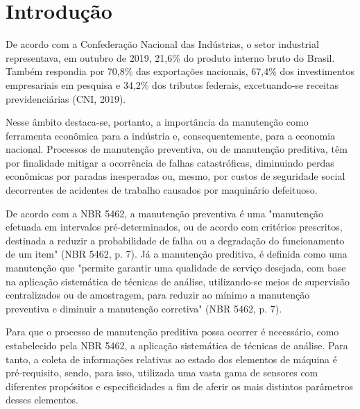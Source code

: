 \documentclass[
	12pt,				
	oneside,			
	a4paper,			
	english,			
	brazil,	
	sumario=abnt-6027-2012		
	]{abntex2ppgsi}
\begin{document}
\tableofcontents*
\cleardoublepage


\textual




\chapter{Introdução}
De acordo com a Confederação Nacional das Indústrias, o setor industrial representava, em outubro de 2019, 21,6\% do produto interno bruto do Brasil. Também respondia por 70,8\% das exportações nacionais, 67,4\% dos investimentos empresariais em pesquisa  e 34,2\% dos tributos federais, excetuando-se receitas previdenciárias (CNI, 2019). 

Nesse âmbito destaca-se, portanto, a importância da manutenção como ferramenta econômica para a indústria e, consequentemente, para a economia nacional. Processos de manutenção preventiva, ou de manutenção preditiva, têm por finalidade mitigar a ocorrência de falhas catastróficas, diminuindo perdas econômicas por paradas inesperadas ou, mesmo, por custos de seguridade social decorrentes de acidentes de trabalho causados por maquinário defeituoso.

De acordo com a NBR 5462, a manutenção preventiva é uma "manutenção efetuada em intervalos pré-determinados, ou de acordo com critérios prescritos, destinada a reduzir a probabilidade de falha ou a degradação do funcionamento de um item" (NBR 5462, p. 7). Já a manutenção preditiva, é definida como uma manutenção que "permite garantir uma qualidade de serviço desejada, com base na aplicação sistemática de técnicas de análise, utilizando-se meios de supervisão centralizados ou de amostragem, para reduzir ao mínimo a manutenção preventiva e diminuir a manutenção corretiva" (NBR 5462, p. 7). 

Para que o processo de manutenção preditiva possa ocorrer é necessário, como estabelecido pela NBR 5462, a aplicação sistemática de técnicas de análise. Para tanto, a coleta de informações relativas ao estado dos elementos de máquina é pré-requisito, sendo, para isso, utilizada uma vasta gama de sensores com diferentes propósitos e especificidades a fim de aferir os mais distintos parâmetros desses elementos. 
\end{document}
